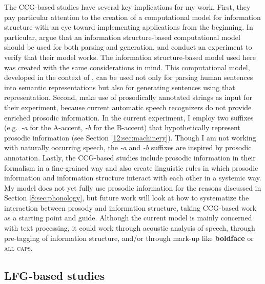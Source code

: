 The CCG-based studies have several key implications for my
work. First, they pay particular attention to the creation of a
computational model for information structure with an eye toward
implementing applications from the beginning.  In particular,
\citet{traat:bos:04} argue that an information structure-based
computational model should be used for both parsing and generation,
and conduct an experiment to verify that their model works.  The
information structure-based model used here was created with the same
considerations in mind. This computational model, developed in the
context of , can be used not only for parsing
human sentences into semantic representations but also for generating
sentences using that representation.  Second,
\citeauthor{traat:bos:04} make use of prosodically annotated strings
as input for their experiment, because current automatic speech
recognizers do not provide enriched prosodic information.  In the
current experiment, I employ two suffixes (e.g.\ 	\textit{-a} for the
A-accent, 	\textit{-b} for the B-accent) that hypothetically represent
prosodic information (see Section \ref{12:sec:machinery}).  Though I am not
working with naturally occurring speech, the 	\textit{-a} and 	\textit{-b} suffixes
are inspired by prosodic annotation.  Lastly, the CCG-based studies
include prosodic information in their formalism in a fine-grained way
and also create linguistic rules in which prosodic information and
information structure interact with each other in a systemic way.  My
model does not yet fully use prosodic information for the reasons
discussed in Section \ref{8:sec:phonology}, but future work will
look at how to systematize the interaction between prosody and
information structure, taking CCG-based work as a starting point and
guide.  Although the current model is mainly concerned with text
processing, it could work through acoustic analysis of speech, through
pre-tagging of information structure, and/or through mark-up like
\textbf{boldface} or \textsc{all caps}.





\subsection{LFG-based studies}
\label{8:ssec:lfg}
\largerpage


